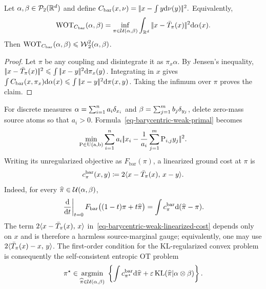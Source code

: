 \begin{prop}\label{prop-barycentric-weak-ot}
Let $\alpha,\beta\in\mathcal{P}_2(\mathbb{R}^d)$ and define
\(C_{\mathrm{bar}}(x,\nu) = |\!| x-\int y\mathrm{d}\nu(y) |\!|^2.\)
Equivalently,
\begin{equation}\label{eq-barycentric-weak-primal}
\operatorname{WOT}_{C_{\mathrm{bar}}}(\alpha,\beta)
=
\inf_{\pi\in\mathcal{U}(\alpha,\beta)}
\int_{\mathbb{R}^d}|\!| x-\bar T_\pi(x) |\!|^2\mathrm{d}\alpha(x).
\end{equation}
Then
$\operatorname{WOT}_{C_{\mathrm{bar}}}(\alpha,\beta) \leqslant \operatorname{\mathcal{W}}_2^2(\alpha,\beta)$.
\end{prop}
\begin{proof}
Let $\pi$ be any coupling and disintegrate it as $\pi_x\alpha$. By Jensen's inequality,
$|\!| x-\bar T_\pi(x) |\!|^2 \leqslant \int|\!| x-y |\!|^2\mathrm{d}\pi_x(y)$.
Integrating in $x$ gives $\int C_{\mathrm{bar}}(x,\pi_x)\mathrm{d}\alpha(x)\leqslant\int|\!| x-y |\!|^2\mathrm{d}\pi(x,y)$. Taking the infimum over $\pi$ proves the claim.
\end{proof}
For discrete measures $\alpha=\sum_{i=1}^n a_i\delta_{x_i}$ and $\beta=\sum_{j=1}^m b_j\delta_{y_j}$, delete zero-mass source atoms so that $a_i>0$. Formula~\eqref{eq-barycentric-weak-primal} becomes
\begin{equation}\label{eq-barycentric-weak-discrete}
\min_{\mathrm{P}\in\mathrm{U}(\mathrm{a},\mathrm{b})}
\sum_{i=1}^n a_i
|\!| x_i-\frac{1}{a_i}\sum_{j=1}^m\mathrm{P}_{i,j}y_j |\!|^2.
\end{equation}
Writing its unregularized objective as $F_{\mathrm{bar}}(\pi)$, a linearized ground cost at $\pi$ is
\begin{equation}\label{eq-barycentric-weak-linearized-cost}
c_\pi^{\mathrm{bar}}(x,y)
\coloneqq
2\langle x-\bar T_\pi(x),\,x-y\rangle.
\end{equation}
Indeed, for every $\widehat\pi\in\mathcal{U}(\alpha,\beta)$,
\[
\left.\frac{\mathrm{d}}{\mathrm{d} t}\right|_{t=0}
F_{\mathrm{bar}}\bigl((1-t)\pi+t\widehat\pi\bigr)
=
\int c_\pi^{\mathrm{bar}}\mathrm{d}(\widehat\pi-\pi).
\]
The term $2\langle x-\bar T_\pi(x),\,x\rangle$ in~\eqref{eq-barycentric-weak-linearized-cost} depends only on $x$ and is therefore a harmless source-marginal gauge; equivalently, one may use $2\langle \bar T_\pi(x)-x,\,y\rangle$. The first-order condition for the KL-regularized convex problem is consequently the self-consistent entropic OT problem
\begin{equation}\label{eq-barycentric-weak-entropic-fixed-point}
\pi^\star
\in
\underset{\widehat\pi\in\mathcal{U}(\alpha,\beta)}{\operatorname{argmin}}\;
\left\{
\int c_{\pi^\star}^{\mathrm{bar}}\mathrm{d}\widehat\pi
+\varepsilon\operatorname{KL}(\widehat\pi|\alpha\otimes\beta)
\right\}.
\end{equation}

